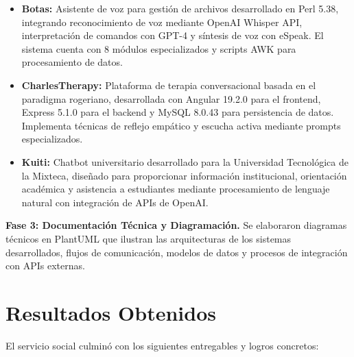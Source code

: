 \documentclass[12pt,letterpaper]{article}
\begin{document}
\begin{itemize}[leftmargin=2cm]
    \item \textbf{Botas:} Asistente de voz para gestión de archivos desarrollado en Perl 5.38, integrando reconocimiento de voz mediante OpenAI Whisper API, interpretación de comandos con GPT-4 y síntesis de voz con eSpeak. El sistema cuenta con 8 módulos especializados y scripts AWK para procesamiento de datos.
    
    \item \textbf{CharlesTherapy:} Plataforma de terapia conversacional basada en el paradigma rogeriano, desarrollada con Angular 19.2.0 para el frontend, Express 5.1.0 para el backend y MySQL 8.0.43 para persistencia de datos. Implementa técnicas de reflejo empático y escucha activa mediante prompts especializados.
    
    \item \textbf{Kuiti:} Chatbot universitario desarrollado para la Universidad Tecnológica de la Mixteca, diseñado para proporcionar información institucional, orientación académica y asistencia a estudiantes mediante procesamiento de lenguaje natural con integración de APIs de OpenAI.
\end{itemize}

\textbf{Fase 3: Documentación Técnica y Diagramación.} Se elaboraron diagramas técnicos en PlantUML que ilustran las arquitecturas de los sistemas desarrollados, flujos de comunicación, modelos de datos y procesos de integración con APIs externas.

\section{Resultados Obtenidos}

El servicio social culminó con los siguientes entregables y logros concretos:
\end{document}
